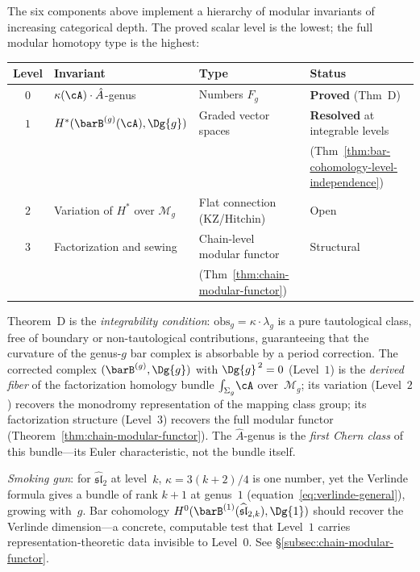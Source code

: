 \begin{remark}%
\label{rem:four-levels}%
%
The six components above implement a hierarchy of modular
invariants of increasing categorical depth.
The proved scalar level is the lowest;
the full modular homotopy type is the highest:
\begin{center}
\renewcommand{\arraystretch}{1.3}
\begin{tabular}{@{}clll@{}}
\toprule
\textbf{Level} & \textbf{Invariant} & \textbf{Type} & \textbf{Status} \\
\midrule
$0$ & $\kappa(\cA) \cdot \hat{A}$-genus
  & Numbers $F_g$ & \textbf{Proved} (Thm~D) \\[2pt]
$1$ & $H^*(\barB^{(g)}(\cA), \Dg{g})$
  & Graded vector spaces & \textbf{Resolved} at integrable levels \\
  & & & (Thm~\ref{thm:bar-cohomology-level-independence}) \\[2pt]
$2$ & Variation of $H^*$ over $\mathcal{M}_g$
  & Flat connection (KZ/Hitchin) & Open \\[2pt]
$3$ & Factorization and sewing
  & Chain-level modular functor & Structural \\
  & & (Thm~\ref{thm:chain-modular-functor}) & \\
\bottomrule
\end{tabular}
\end{center}
Theorem~D is the \emph{integrability condition}:
$\mathrm{obs}_g = \kappa \cdot \lambda_g$ is a pure
tautological class, free of boundary or non-tautological
contributions, guaranteeing that the curvature of the genus-$g$
bar complex is absorbable by a period correction.
The corrected complex $(\barB^{(g)}, \Dg{g})$ with
$\Dg{g}^{\,2} = 0$ (Level~$1$) is the
\emph{derived fiber} of the factorization homology bundle
$\int_{\Sigma_g}\!\cA$ over~$\mathcal{M}_g$; its variation
(Level~$2$) recovers the monodromy representation of the mapping
class group; its factorization structure (Level~$3$) recovers the
full modular functor
(Theorem~\ref{thm:chain-modular-functor}).  The $\hat{A}$-genus
is the \emph{first Chern class} of this bundle---its Euler
characteristic, not the bundle itself.

\smallskip\noindent
\emph{Smoking gun}: for $\widehat{\mathfrak{sl}}_2$ at level~$k$,
$\kappa = 3(k{+}2)/4$ is one number, yet the Verlinde formula
gives a bundle of rank $k{+}1$ at genus~$1$
(equation~\eqref{eq:verlinde-general}), growing with~$g$.
Bar cohomology $H^0(\barB^{(1)}(\widehat{\mathfrak{sl}}_{2,k}),
\Dg{1})$ should recover the Verlinde dimension---a concrete,
computable test that Level~$1$ carries representation-theoretic
data invisible to Level~$0$.  See
\S\ref{subsec:chain-modular-functor}.


\end{remark}
